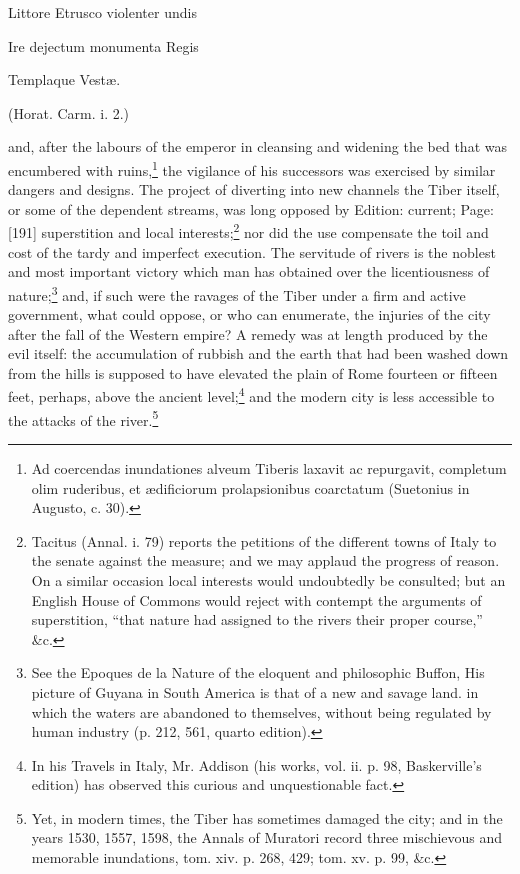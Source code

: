 {Littore Etrusco violenter undis

Ire dejectum monumenta Regis

Templaque Vestæ.

(Horat. Carm. i. 2.)} and, after the labours of the emperor in cleansing and widening the bed that was encumbered with ruins,\footnote{Ad coercendas inundationes alveum Tiberis laxavit ac repurgavit, completum olim ruderibus, et ædificiorum prolapsionibus coarctatum (Suetonius in Augusto, c. 30).} the vigilance of his successors was exercised by similar dangers and designs. The project of diverting into new channels the Tiber itself, or some of the dependent streams, was long opposed by Edition: current; Page: [191] superstition and local interests;\footnote{Tacitus (Annal. i. 79) reports the petitions of the different towns of Italy to the senate against the measure; and we may applaud the progress of reason. On a similar occasion local interests would undoubtedly be consulted; but an English House of Commons would reject with contempt the arguments of superstition, \texthebrew{“}that nature had assigned to the rivers their proper course,\texthebrew{}” \&c.} nor did the use compensate the toil and cost of the tardy and imperfect execution. The servitude of rivers is the noblest and most important victory which man has obtained over the licentiousness of nature;\footnote{See the Epoques de la Nature of the eloquent and philosophic Buffon, His picture of Guyana in South America is that of a new and savage land. in which the waters are abandoned to themselves, without being regulated by human industry (p. 212, 561, quarto edition).} and, if such were the ravages of the Tiber under a firm and active government, what could oppose, or who can enumerate, the injuries of the city after the fall of the Western empire? A remedy was at length produced by the evil itself: the accumulation of rubbish and the earth that had been washed down from the hills is supposed to have elevated the plain of Rome fourteen or fifteen feet, perhaps, above the ancient level;\footnote{In his Travels in Italy, Mr. Addison (his works, vol. ii. p. 98, Baskerville\texthebrew{}’s edition) has observed this curious and unquestionable fact.} and the modern city is less accessible to the attacks of the river.\footnote{Yet, in modern times, the Tiber has sometimes damaged the city; and in the years 1530, 1557, 1598, the Annals of Muratori record three mischievous and memorable inundations, tom. xiv. p. 268, 429; tom. xv. p. 99, \&c.}

